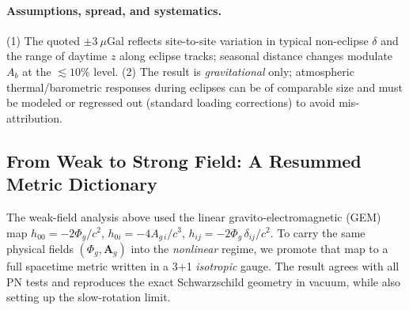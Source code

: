 \medskip
\noindent
{}

\paragraph{Assumptions, spread, and systematics.}
(1) The quoted $\pm 3~\mu$Gal reflects site-to-site variation in typical non-eclipse
$\delta$ and the range of daytime $z$ along eclipse tracks; seasonal distance changes
modulate $A_b$ at the $\lesssim 10\%$ level.
(2) The result is \emph{gravitational} only; atmospheric thermal/barometric responses
during eclipses can be of comparable size and must be modeled or regressed out
(standard loading corrections) to avoid mis-attribution.

\subsection{From Weak to Strong Field: A Resummed Metric Dictionary}
\label{sec:strong-dict}

The weak-field analysis above used the linear gravito-electromagnetic (GEM) map
\(h_{00}=-2\Phi_g/c^2\), \(h_{0i}=-4A_{g\,i}/c^3\), \(h_{ij}=-2\Phi_g\,\delta_{ij}/c^2\).
To carry the same physical fields \((\Phi_g,\mathbf A_g)\) into the \emph{nonlinear} regime, we promote that map to a full spacetime metric written in a 3\(+\)1 \emph{isotropic} gauge. The result agrees with all PN tests and reproduces the exact Schwarzschild geometry in vacuum, while also setting up the slow-rotation limit.

